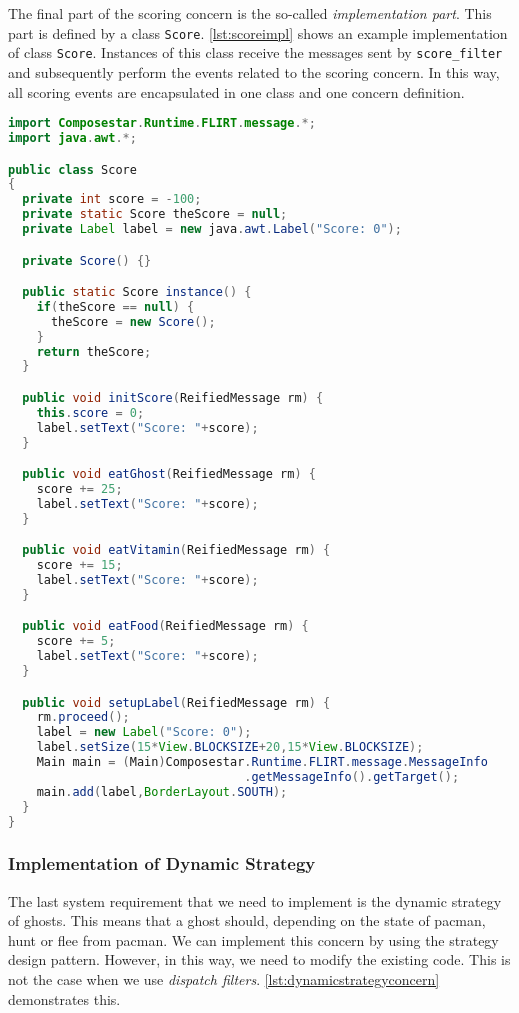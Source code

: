 The final part of the scoring concern is the so-called \emph{implementation part}.
This part is defined by a class \lstinline|Score|.
\autoref{lst:scoreimpl} shows an example implementation of class \lstinline|Score|.
Instances of this class receive the messages sent by \lstinline|score_filter| and subsequently perform the events related to the scoring concern.
In this way, all scoring events are encapsulated in one class and one \Compose* concern definition. 

\begin{lstlisting}[style=floatlisting,language=Java,caption={Implementation of class \expandafter{\lstinline[style=inline]|Score|}},label=lst:scoreimpl]
import Composestar.Runtime.FLIRT.message.*;
import java.awt.*;

public class Score 
{
  private int score = -100;
  private static Score theScore = null;
  private Label label = new java.awt.Label("Score: 0");

  private Score() {}

  public static Score instance() {
    if(theScore == null) {
      theScore = new Score();
    }
    return theScore;
  }

  public void initScore(ReifiedMessage rm) {
    this.score = 0;
    label.setText("Score: "+score);
  }

  public void eatGhost(ReifiedMessage rm) {
    score += 25;
    label.setText("Score: "+score);
  }

  public void eatVitamin(ReifiedMessage rm) {
    score += 15;
    label.setText("Score: "+score);
  }

  public void eatFood(ReifiedMessage rm) {
    score += 5;
    label.setText("Score: "+score);
  }

  public void setupLabel(ReifiedMessage rm) {
    rm.proceed();
    label = new Label("Score: 0");
    label.setSize(15*View.BLOCKSIZE+20,15*View.BLOCKSIZE);
    Main main = (Main)Composestar.Runtime.FLIRT.message.MessageInfo
                                 .getMessageInfo().getTarget();
    main.add(label,BorderLayout.SOUTH);
  }
}
\end{lstlisting}

\subsubsection{Implementation of Dynamic Strategy}
The last system requirement that we need to implement is the dynamic strategy of ghosts.
This means that a ghost should, depending on the state of pacman, hunt or flee from pacman.
We can implement this concern by using the strategy design pattern.
However, in this way, we need to modify the existing code.
This is not the case when we use \Compose*{} \emph{dispatch filters}.
\autoref{lst:dynamicstrategyconcern} demonstrates this. 

